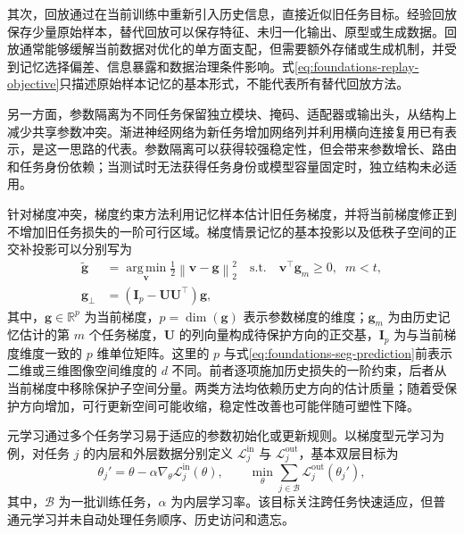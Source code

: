 其次，回放通过在当前训练中重新引入历史信息，直接近似旧任务目标。经验回放保存少量原始样本，替代回放可以保存特征、未归一化输出、原型或生成数据\cite{method_replay_er}。回放通常能够缓解当前数据对优化的单方面支配，但需要额外存储或生成机制，并受到记忆选择偏差、信息暴露和数据治理条件影响。式\eqref{eq:foundations-replay-objective}只描述原始样本记忆的基本形式，不能代表所有替代回放方法。

另一方面，参数隔离为不同任务保留独立模块、掩码、适配器或输出头，从结构上减少共享参数冲突。渐进神经网络为新任务增加网络列并利用横向连接复用已有表示，是这一思路的代表\cite{method_dyn_pnn}。参数隔离可以获得较强稳定性，但会带来参数增长、路由和任务身份依赖；当测试时无法获得任务身份或模型容量固定时，独立结构未必适用。

针对梯度冲突，梯度约束方法利用记忆样本估计旧任务梯度，并将当前梯度修正到不增加旧任务损失的一阶可行区域。梯度情景记忆的基本投影以及低秩子空间的正交补投影可以分别写为\cite{method_replay_gem,saha2021gpm}
\begin{equation}
\begin{aligned}
\widetilde{\mathbf{g}}
&=
\operatorname*{arg\,min}_{\mathbf{v}}
\frac{1}{2}
\left\|
\mathbf{v}-\mathbf{g}
\right\|_2^2
\quad
\mathrm{s.t.}\quad
\mathbf{v}^{\top}\mathbf{g}_m\geq 0,\;\;m<t,
\\
\mathbf{g}_{\perp}
&=
\left(
\mathbf{I}_{p}
-
\mathbf{U}\mathbf{U}^{\top}
\right)
\mathbf{g},
\end{aligned}
\label{eq:foundations-gradient-projection}
\end{equation}
其中，$\mathbf{g}\in\mathbb{R}^{p}$ 为当前梯度，$p=\dim(\mathbf{g})$ 表示参数梯度的维度；$\mathbf{g}_m$ 为由历史记忆估计的第 $m$ 个任务梯度，$\mathbf{U}$ 的列向量构成待保护方向的正交基，$\mathbf{I}_{p}$ 为与当前梯度维度一致的 $p$ 维单位矩阵。这里的 $p$ 与式\eqref{eq:foundations-seg-prediction}前表示二维或三维图像空间维度的 $d$ 不同。前者逐项施加历史损失的一阶约束，后者从当前梯度中移除保护子空间分量。两类方法均依赖历史方向的估计质量；随着受保护方向增加，可行更新空间可能收缩，稳定性改善也可能伴随可塑性下降。

元学习通过多个任务学习易于适应的参数初始化或更新规则。以梯度型元学习为例，对任务 $j$ 的内层和外层数据分别定义 $\mathcal{L}_{j}^{\mathrm{in}}$ 与 $\mathcal{L}_{j}^{\mathrm{out}}$，基本双层目标为\cite{finn2017maml}
\begin{equation}
\theta_j'
=
\theta
-
\alpha
\nabla_{\theta}
\mathcal{L}_{j}^{\mathrm{in}}(\theta),
\qquad
\min_{\theta}
\sum_{j\in\mathcal{B}}
\mathcal{L}_{j}^{\mathrm{out}}
\!\left(\theta_j'\right),
\label{eq:foundations-maml}
\end{equation}
其中，$\mathcal{B}$ 为一批训练任务，$\alpha$ 为内层学习率。该目标关注跨任务快速适应，但普通元学习并未自动处理任务顺序、历史访问和遗忘。

